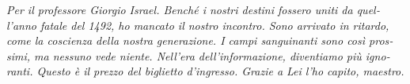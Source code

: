 \documentclass[paper=A4,portrait,twoside=true,twocolumn=true,headinclude=false,footinclude=false,fontsize=10,BCOR=15mm,DIV=13,pagesize=auto,titlepage=firstiscover,mpinclude=true,headings=twolinechapter,open=right,chapterprefix=false,numbers=noendperiod,headsepline=false,parskip=false]{scrbook}
\theoremstyle{definition}
\begin{document}
\newpage 

\begin{FlushRight}
\begin{italian}
\textit{Per il professore Giorgio Israel. \newline Benché i nostri destini fossero uniti da quell'anno fatale del 1492, \linebreak ho mancato il nostro incontro. \linebreak Sono arrivato in ritardo, come la coscienza della nostra generazione. \linebreak I campi sanguinanti sono così prossimi, \linebreak ma nessuno vede niente. \linebreak Nell'era dell'informazione, diventiamo più ignoranti. \linebreak Questo è il prezzo del biglietto d'ingresso. \linebreak Grazie a Lei l'ho capito, maestro.}
\end{italian}
\end{FlushRight}

\newpage
\tableofcontents 

\frontmatter
\twocolumn
\pagestyle{plain}

\mainmatter
\pagestyle{scrheadings}
\end{document}
